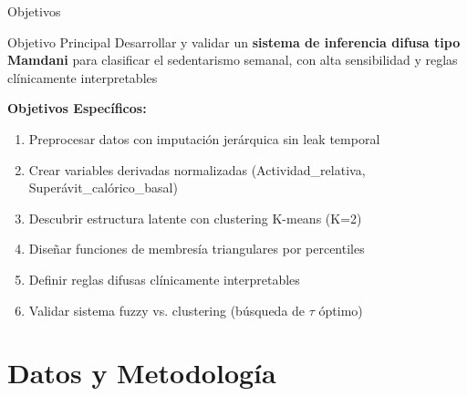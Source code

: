 \documentclass[aspectratio=169]{beamer}
\begin{document}

\begin{frame}{Objetivos}

\begin{block}{Objetivo Principal}
Desarrollar y validar un \textbf{sistema de inferencia difusa tipo Mamdani} para clasificar el sedentarismo semanal, con alta sensibilidad y reglas clínicamente interpretables
\end{block}

\vspace{0.5cm}

\textbf{Objetivos Específicos:}
\begin{enumerate}
    \item Preprocesar datos con imputación jerárquica sin leak temporal
    \item Crear variables derivadas normalizadas (Actividad\_relativa, Superávit\_calórico\_basal)
    \item Descubrir estructura latente con clustering K-means (K=2)
    \item Diseñar funciones de membresía triangulares por percentiles
    \item Definir reglas difusas clínicamente interpretables
    \item Validar sistema fuzzy vs. clustering (búsqueda de $\tau$ óptimo)
\end{enumerate}

\end{frame}


\section{Datos y Metodología}
\end{document}

